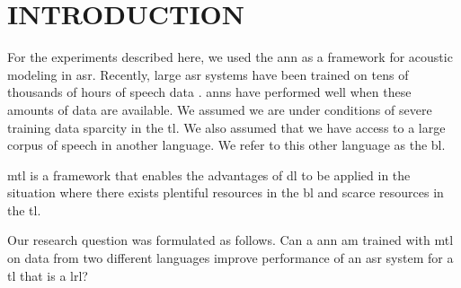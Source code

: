 \section{INTRODUCTION}
\label{sec-2}

For the experiments described here, we used the \gls{ann} as a framework for acoustic modeling in \gls{asr}. 
Recently, large \gls{asr} systems have been trained on tens of thousands of hours of speech data \cite{Heigold13multilingualacoustic}. 
\glspl{ann} have performed well when these amounts of data are available. 
We assumed we are under conditions of severe training data sparcity
in the \gls{tl}.
We also assumed that we have access to a large corpus of speech in another language. 
We refer to this other language as the \gls{bl}.

\gls{mtl}\cite{Caruana93multitasklearning:} is a framework that enables the advantages of \gls{dl} to be applied in the situation where
there exists
plentiful resources
in the \gls{bl} and scarce resources in the \gls{tl}.  

Our research question was formulated as follows.
Can a \gls{ann} \gls{am} trained with \gls{mtl} on data  from  two different languages improve performance of an  \gls{asr} system for a  \gls{tl} that is a \gls{lrl}?
